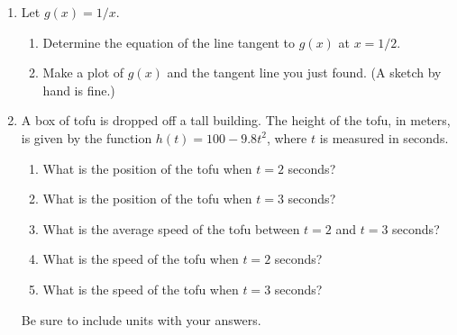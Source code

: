 \documentclass[12pt]{article}
\begin{document}
\begin{enumerate}
\setlength{\itemsep}{8mm}


\item Let $g(x) = 1/x$.
  \begin{enumerate}
    \item Determine the equation of the line tangent to $g(x)$ at
      $x=1/2$.
    \item Make a plot of $g(x)$ and the tangent line you just
      found. (A sketch by hand is fine.)
  \end{enumerate}

\item A box of tofu is dropped off a tall building. The height of the
  tofu, in meters, is given by the function $h(t) = 100 - 9.8t^2$,
  where $t$ is measured in seconds.
  \begin{enumerate}
  \item What is the position of the tofu when $t=2$ seconds?
  \item What is the position of the tofu when $t=3$ seconds?
  \item What is the average speed of the tofu between $t=2$ and
    $t=3$ seconds?
  \item What is the speed of the tofu when $t=2$ seconds?
  \item What is the speed of the tofu when $t=3$ seconds?
  \end{enumerate}
  Be sure to include units with your answers. 
  
\end{enumerate}
\end{document}
